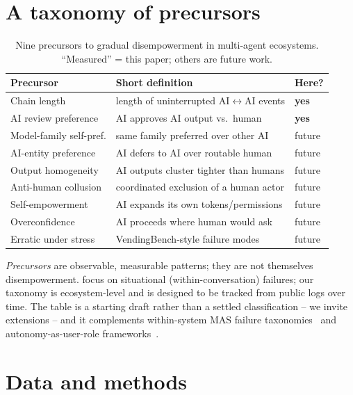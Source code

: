 \documentclass{article}
\begin{document}
\section{A taxonomy of precursors}
\label{sec:taxonomy}

\begin{table}[h]
\centering\footnotesize
\caption{Nine precursors to gradual disempowerment in multi-agent ecosystems. ``Measured'' = this paper; others are future work.}
\label{tab:taxonomy}
\begin{tabular}{@{}lll@{}}
\toprule
Precursor & Short definition & Here? \\
\midrule
Chain length & length of uninterrupted AI$\leftrightarrow$AI events & \textbf{yes} \\
AI review preference & AI approves AI output vs.\ human & \textbf{yes} \\
Model-family self-pref. & same family preferred over other AI & future \\
AI-entity preference & AI defers to AI over routable human & future \\
Output homogeneity & AI outputs cluster tighter than humans & future \\
Anti-human collusion & coordinated exclusion of a human actor & future \\
Self-empowerment & AI expands its own tokens/permissions & future \\
Overconfidence & AI proceeds where human would ask & future \\
Erratic under stress & VendingBench-style failure modes & future \\
\bottomrule
\end{tabular}
\end{table}

\emph{Precursors} are observable, measurable patterns; they are not themselves disempowerment. \citet{sharma2026whos} focus on situational (within-conversation) failures; our taxonomy is ecosystem-level and is designed to be tracked from public logs over time. The table is a starting draft rather than a settled classification -- we invite extensions -- and it complements within-system MAS failure taxonomies~\citep{cemri2025mas} and autonomy-as-user-role frameworks~\citep{cihon2025autonomy,feng2025autonomylevels}.

\section{Data and methods}
\label{sec:methods}
\end{document}
